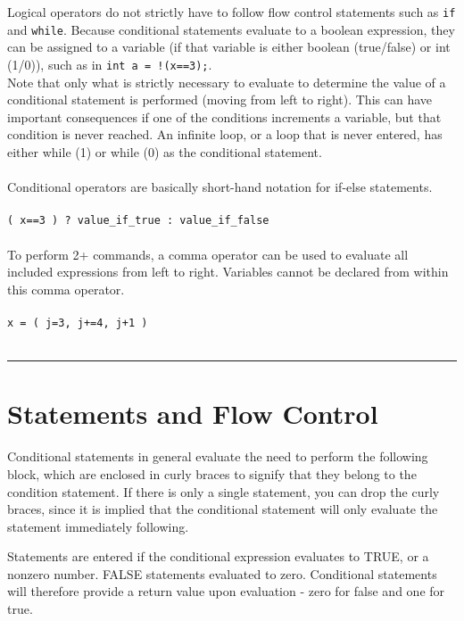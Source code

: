 \documentclass[10pt]{article}
\begin{document}
\begin{flushleft}
Logical operators do not strictly have to follow flow control statements such as \texttt{if} and \texttt{while}. Because conditional statements evaluate to a boolean expression, they can be assigned to a variable (if that variable is either boolean (true/false) or int (1/0)), such as in \texttt{int a = !(x==3);}.
\\
Note that only what is strictly necessary to evaluate to determine the value of a conditional statement is performed (moving from left to right). This can have important consequences if one of the conditions increments a variable, but that condition is never reached. An infinite loop, or a loop that is never entered, has either while (1) or while (0) as the conditional statement.\\
\\
Conditional operators are basically short-hand notation for if-else statements.\\
\\
\color{red}\texttt{( x==3 ) ? value\_if\_true : value\_if\_false}\color{black}\\
\\
To perform 2+ commands, a comma operator can be used to evaluate all included expressions from left to right. Variables cannot be declared from within this comma operator.\\
\\
\color{red}\texttt{x = ( j=3, j+=4, j+1 )}\color{black}\\
\\
\newline
\noindent\rule{16.5cm}{0.4pt}
\end{flushleft}

\section{Statements and Flow Control}

Conditional statements in general evaluate the need to perform the following block, which are enclosed in curly braces to signify that they belong to the condition statement. If there is only a single statement, you can drop the curly braces, since it is implied that the conditional statement will only evaluate the statement immediately following.

Statements are entered if the conditional expression evaluates to TRUE, or a nonzero number. FALSE statements evaluated to zero. Conditional statements will therefore provide a return value upon evaluation - zero for false and one for true. 
\end{document}
